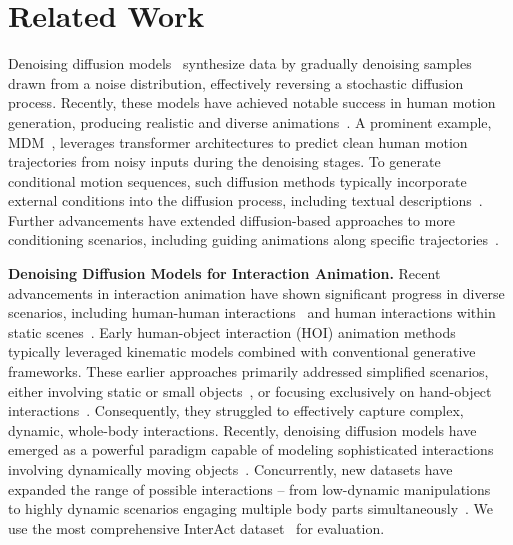 \section{Related Work}

Denoising diffusion models~\citep{sohl2015deep,song2020denoising,ho2020denoising} synthesize data by gradually denoising samples drawn from a noise distribution, effectively reversing a stochastic diffusion process. Recently, these models have achieved notable success in human motion generation, producing realistic and diverse animations~\citep{barquero2022belfusion,tevet2023human,zhang2022motiondiffuse,raab2023single,zhang2023t2m,yonatan2023,zhang2023tedi}. A prominent example, MDM~\citep{tevet2023human}, leverages transformer architectures to predict clean human motion trajectories from noisy inputs during the denoising stages. To generate conditional motion sequences, such diffusion methods typically incorporate external conditions into the diffusion process, including textual descriptions~\citep{petrovich2023tmr,guo2022tm2t,petrovich22temos,zhang2022motiondiffuse,zhang2023motiongpt,tevet2022motionclip,barquero2024seamless}. Further advancements have extended diffusion-based approaches to more conditioning scenarios, including guiding animations along specific trajectories~\citep{karunratanakul2023gmd,rempe2023trace,xie2023omnicontrol}.

\noindent \textbf{Denoising Diffusion Models for Interaction Animation.}
Recent advancements in interaction animation have shown significant progress in diverse scenarios, including human-human interactions~\citep{liang2023intergen,CMU-Mocap,singleshotmultiperson2018,xu2023inter, xu2023stochastic} and human interactions within static scenes~\citep{hassan_samp_2021,cao2020long,hassan2019resolving}. Early human-object interaction (HOI) animation methods typically leveraged kinematic models combined with conventional generative frameworks. These earlier approaches primarily addressed simplified scenarios, either involving static or small objects~\citep{xie2022chore,zhang2020perceiving,wang2022reconstructing,petrov2023object,taheri2022goal,wu2022saga,kulkarni2023nifty,zhang2022couch}, or focusing exclusively on hand-object interactions~\citep{li2023task,ye2023affordance,zheng2023cams,zhou2022toch,zhang2024manidext,zhang2023artigrasp}. Consequently, they struggled to effectively capture complex, dynamic, whole-body interactions. Recently, denoising diffusion models have emerged as a powerful paradigm capable of modeling sophisticated interactions involving dynamically moving objects~\citep{peng2023hoi,diller2023cg,li2023controllable,wu2024thor,wu2024human,song2024hoianimator,xu2024interdreamer,zhang2024hoi}. 
Concurrently, new datasets have expanded the range of possible interactions -- from low-dynamic manipulations~\citep{taheri2020grab} to highly dynamic scenarios engaging multiple body parts simultaneously~\citep{bhatnagar22behave,jiang2022chairs,huang2022intercap,zhang2023neuraldome,fan2023arctic,li2023object,zhao2023im,kim2024parahome,jiang2024scaling,yang2024f}. We use the most comprehensive InterAct dataset~\citep{xu2025interact} for evaluation.



